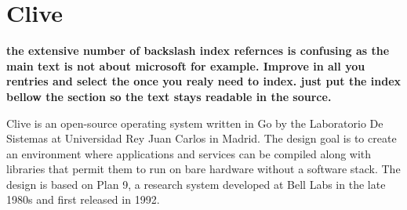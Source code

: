 \section{Clive}

{\bf the extensive number of backslash index refernces is confusing as the main
  text is not about microsoft for example. Improve in all you rentries
and select the once you realy need to index. just put the index bellow
the section so the text stays readable in the source.}


Clive is an open-source operating system written in Go by
the Laboratorio De Sistemas at Universidad Rey Juan
Carlos in
Madrid\cite{hid-sp18-419-www-clive-lsub}. The design goal is to create
an environment where applications and services can be compiled along
with libraries that permit them to run on bare hardware without a
software stack\cite{hid-sp18-419-www-clive-lsub2014}. The design is
based on Plan 9, a research system developed at Bell
Labs in the late 1980s and first released in
1992\cite{hid-sp18-419-www-about-plan9}.
